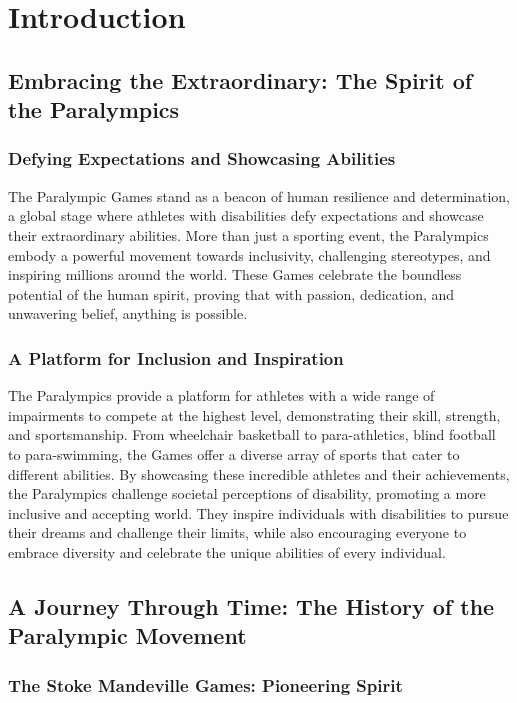 \chapter{Introduction}

\section{Embracing the Extraordinary: The Spirit of the Paralympics}

\subsection{Defying Expectations and Showcasing Abilities}

The Paralympic Games stand as a beacon of human resilience and determination, a global stage where athletes with disabilities defy expectations and showcase their extraordinary abilities. More than just a sporting event, the Paralympics embody a powerful movement towards inclusivity, challenging stereotypes, and inspiring millions around the world. These Games celebrate the boundless potential of the human spirit, proving that with passion, dedication, and unwavering belief, anything is possible.
\cite{Paralympics}

\subsection{A Platform for Inclusion and Inspiration}

The Paralympics provide a platform for athletes with a wide range of impairments to compete at the highest level, demonstrating their skill, strength, and sportsmanship. From wheelchair basketball to para-athletics, blind football to para-swimming, the Games offer a diverse array of sports that cater to different abilities. By showcasing these incredible athletes and their achievements, the Paralympics challenge societal perceptions of disability, promoting a more inclusive and accepting world. They inspire individuals with disabilities to pursue their dreams and challenge their limits, while also encouraging everyone to embrace diversity and celebrate the unique abilities of every individual.

\section{A Journey Through Time: The History of the Paralympic Movement}

\subsection{The Stoke Mandeville Games: Pioneering Spirit}

